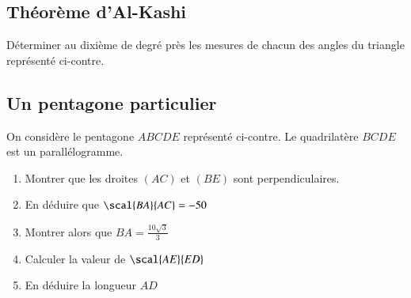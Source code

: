 \documentclass[oneside,12pt]{article}          %
\begin{document}
\subsection{Théorème d'Al-Kashi}

\begin{minipage}{0.4\linewidth}
\end{minipage}%
\begin{minipage}{0.5\linewidth}
  Déterminer au dixième de degré près les mesures de chacun des angles du triangle représenté ci-contre.
\end{minipage}



\subsection{Un pentagone particulier}


\begin{minipage}{0.5\linewidth}
    On considère le pentagone $ABCDE$ représenté ci-contre. Le quadrilatère $BCDE$ est un parallélogramme.

    \begin{enumerate}
        \item Montrer que les droites $(AC)$ et $(BE)$ sont perpendiculaires.
        \item En déduire que $\scal{BA}{AC}=-50$
        \item Montrer alors que $BA=\frac{10\sqrt{3}}{3}$
        \item Calculer la valeur de $\scal{AE}{ED}$
        \item En déduire la longueur $AD$
    \end{enumerate}
\end{minipage}\hfill
\begin{minipage}{0.45\linewidth}
\end{minipage}
\end{document}
